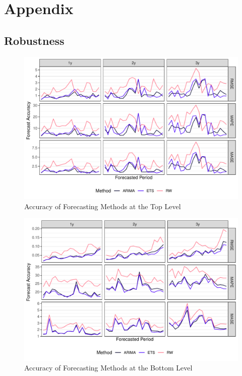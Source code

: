 
\appendix
\section{Appendix}


\subsection{Robustness}
\label{sec:robust}

\begin{figure}[H]
	\includegraphics[width=\textwidth]{fig/fig_eval_methods_top}
	\caption{Accuracy of Forecasting Methods at the Top Level}
\end{figure}

\begin{figure}[H]
	\includegraphics[width=\textwidth]{fig/fig_eval_methods_bottom}
	\caption{Accuracy of Forecasting Methods at the Bottom Level}
\end{figure}


